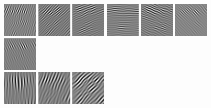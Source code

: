 \begin{figure}
\begin{center}
  \includegraphics[scale=0.5]{ch4/figures/real_0_1.jpg}
  \includegraphics[scale=0.5]{ch4/figures/real_0_2.jpg}
  \includegraphics[scale=0.5]{ch4/figures/real_0_3.jpg}
  \includegraphics[scale=0.5]{ch4/figures/real_0_4.jpg}
  \includegraphics[scale=0.5]{ch4/figures/real_0_5.jpg}
  \includegraphics[scale=0.5]{ch4/figures/real_0_6.jpg}
  \includegraphics[scale=0.5]{ch4/figures/real_0_7.jpg}\\
  \includegraphics[scale=0.5]{ch4/figures/real_1_0.jpg}
  \includegraphics[scale=0.5]{ch4/figures/real_1_1.jpg}
  \includegraphics[scale=0.5]{ch4/figures/real_1_2.jpg}

\end{center}
\end{figure}
